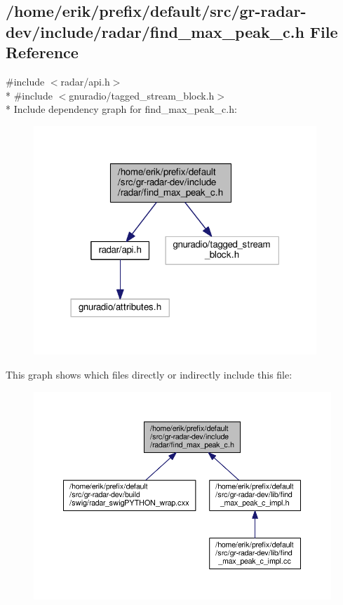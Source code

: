 \subsection{/home/erik/prefix/default/src/gr-\/radar-\/dev/include/radar/find\+\_\+max\+\_\+peak\+\_\+c.h File Reference}
\label{find__max__peak__c_8h}
{\ttfamily \#include $<$radar/api.\+h$>$}\\*
{\ttfamily \#include $<$gnuradio/tagged\+\_\+stream\+\_\+block.\+h$>$}\\*
Include dependency graph for find\+\_\+max\+\_\+peak\+\_\+c.\+h\+:
\nopagebreak
\begin{figure}[H]
\begin{center}
\leavevmode
\includegraphics[width=302pt]{d1/d18/find__max__peak__c_8h__incl}
\end{center}
\end{figure}
This graph shows which files directly or indirectly include this file\+:
\nopagebreak
\begin{figure}[H]
\begin{center}
\leavevmode
\includegraphics[width=350pt]{d9/d80/find__max__peak__c_8h__dep__incl}
\end{center}
\end{figure}
